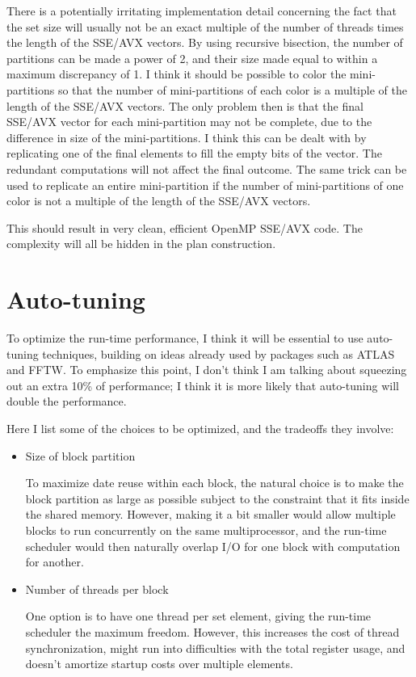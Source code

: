 \documentclass[12pt]{article}
\begin{document}
There is a potentially irritating implementation detail concerning the
fact that the set size will usually not be an exact multiple of the number
of threads times the length of the SSE/AVX vectors.  By using recursive
bisection, the number of partitions can be made a power of 2, and their
size made equal to within a maximum discrepancy of 1.  I think it should
be possible to color the mini-partitions so that the number of
mini-partitions of each color is a multiple of the length of the SSE/AVX
vectors.  The only problem then is that the final SSE/AVX vector for
each mini-partition may not be complete, due to the difference in size of
the mini-partitions.  I think this can be dealt with by replicating one
of the final elements to fill the empty bits of the vector.  The redundant
computations will not affect the final outcome.  The same trick can be
used to replicate an entire mini-partition if the number of mini-partitions
of one color is not a multiple of the length of the SSE/AVX vectors.

This should result in very clean, efficient OpenMP SSE/AVX code.  The
complexity will all be hidden in the plan construction.

\newpage

\section{Auto-tuning}

To optimize the run-time performance, I think it will be essential
to use auto-tuning techniques, building on ideas already used by
packages such as ATLAS and FFTW.  To emphasize this point, I don't
think I am talking about squeezing out an extra 10\% of performance;
I think it is more likely that auto-tuning will double the performance.


Here I list some of the choices to be optimized, and the tradeoffs
they involve:
\begin{itemize}
\item
Size of block partition

To maximize date reuse within each block, the natural choice is
to make the block partition as large as possible subject to the
constraint that it fits inside the shared memory.  However,
making it a bit smaller would allow multiple blocks to run
concurrently on the same multiprocessor, and the run-time
scheduler would then naturally overlap I/O for one block
with computation for another.

\item
Number of threads per block

One option is to have one thread per set element, giving the
run-time scheduler the maximum freedom.  However, this increases
the cost of thread synchronization, might run into difficulties
with the total register usage, and doesn't amortize startup
costs over multiple elements.

\end{itemize}
\end{document}
